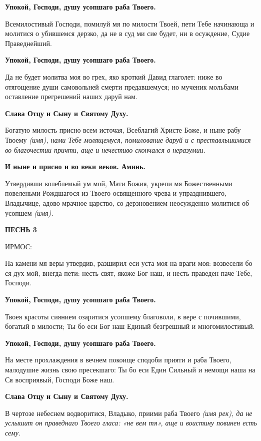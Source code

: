\bfseries Упокой, Господи, душу усопшаго раба Твоего.\normalfont{}\normalfont{}


Всемилостивый Господи, помилуй мя по милости Твоей, пети Тебе начинающа и молитися о убившемся дерзко, да не в суд ми сие будет, ни в осуждение, Судие Праведнейший.


\bfseries Упокой, Господи, душу усопшаго раба Твоего.\normalfont{}\normalfont{}


Да не будет молитва моя во грех, яко кроткий Давид глаголет: ниже во отягощение души самовольней смерти предавшемуся; но мученик мольбами оставление прегрешений наших даруй нам.


\bfseries Слава Отцу и Сыну и Святому Духу.\normalfont{}\normalfont{}


Богатую милость присно всем источая, Всеблагий Христе Боже, и ныне рабу Твоему \itshape (имя)\normalfont{}, нами Тебе молящемуся, помилование даруй и с преставльшимися во благочестии причти, аще и нечестиво скончался в неразумии.


\bfseries И ныне и присно и во веки веков. Аминь.\normalfont{}\normalfont{}


Утвердивши колеблемый ум мой, Мати Божия, укрепи мя Божественными повеленьми Рождшагося из Твоего освященного чрева и упразднившего, Владычице, адово мрачное царство, со дерзновением неосужденно молитися об усопшем \itshape (имя)\normalfont{}. 


\bfseries ПЕСНЬ 3


ИРМОС:\normalfont{}


На камени мя веры утвердив, разширил еси уста моя на враги моя: возвесели бо ся дух мой, внегда пети: несть свят, якоже Бог наш, и несть праведен паче Тебе, Господи.


\bfseries Упокой, Господи, душу усопшаго раба Твоего.\normalfont{}\normalfont{}


Твоея красоты сиянием озаритися усопшему благоволи, в вере с почившими, богатый в милости; Ты бо еси Бог наш Единый безгрешный и многомилостивый.


\bfseries Упокой, Господи, душу усопшаго раба Твоего.\normalfont{}\normalfont{}


На месте прохлаждения в вечнем покоище сподоби прияти и раба Твоего, малодушие жизнь свою пресекшаго: Ты бо еси Един Сильный и немощи наша на Ся восприявый, Господи Боже наш.


\bfseries Слава Отцу и Сыну и Святому Духу.\normalfont{}\normalfont{}


В чертозе небеснем водворитися, Владыко, приими раба Твоего \itshape (имя рек)\normalfont{}, да не услышит он праведнаго Твоего гласа: «не вем тя», аще и воистину повинен есть сему.


